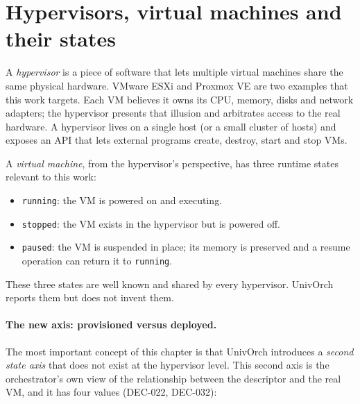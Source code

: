 \section{Hypervisors, virtual machines and their states}
\label{sec:hipervisores}

A \emph{hypervisor} is a piece of software that lets multiple
virtual machines share the same physical hardware. VMware ESXi and
Proxmox VE are two examples that this work targets. Each VM
believes it owns its CPU, memory, disks and network adapters; the
hypervisor presents that illusion and arbitrates access to the real
hardware. A hypervisor lives on a single host (or a small cluster of
hosts) and exposes an API that lets external programs create,
destroy, start and stop VMs.

A \emph{virtual machine}, from the hypervisor's perspective, has
three runtime states relevant to this work:

\begin{itemize}
  \item \texttt{running}: the VM is powered on and executing.
  \item \texttt{stopped}: the VM exists in the hypervisor but is
        powered off.
  \item \texttt{paused}: the VM is suspended in place; its memory
        is preserved and a resume operation can return it to
        \texttt{running}.
\end{itemize}

These three states are well known and shared by every hypervisor.
UnivOrch reports them but does not invent them.

\paragraph{The new axis: provisioned versus deployed.}
The most important concept of this chapter is that UnivOrch
introduces a \emph{second state axis} that does not exist at the
hypervisor level. This second axis is the orchestrator's own view of
the relationship between the descriptor and the real VM, and it has
four values (DEC-022, DEC-032):

